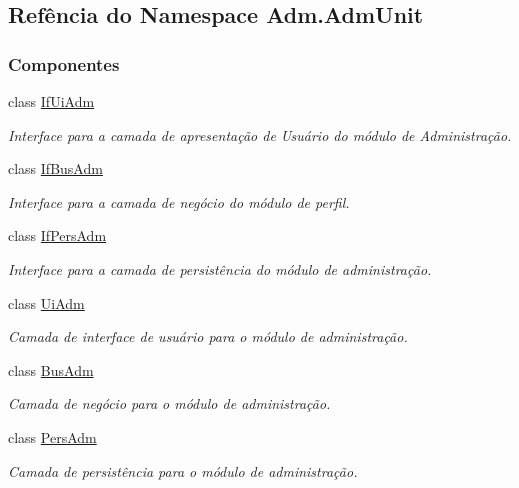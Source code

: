 \hypertarget{namespaceAdm_1_1AdmUnit}{\subsection{Refência do Namespace Adm.\-Adm\-Unit}
\label{namespaceAdm_1_1AdmUnit}
}
\subsubsection*{Componentes}
\begin{DoxyCompactItemize}
\item 
class \hyperlink{classAdm_1_1AdmUnit_1_1IfUiAdm}{If\-Ui\-Adm}
\begin{DoxyCompactList}\small\item\em Interface para a camada de apresentação de Usuário do módulo de Administração. \end{DoxyCompactList}\item 
class \hyperlink{classAdm_1_1AdmUnit_1_1IfBusAdm}{If\-Bus\-Adm}
\begin{DoxyCompactList}\small\item\em Interface para a camada de negócio do módulo de perfil. \end{DoxyCompactList}\item 
class \hyperlink{classAdm_1_1AdmUnit_1_1IfPersAdm}{If\-Pers\-Adm}
\begin{DoxyCompactList}\small\item\em Interface para a camada de persistência do módulo de administração. \end{DoxyCompactList}\item 
class \hyperlink{classAdm_1_1AdmUnit_1_1UiAdm}{Ui\-Adm}
\begin{DoxyCompactList}\small\item\em Camada de interface de usuário para o módulo de administração. \end{DoxyCompactList}\item 
class \hyperlink{classAdm_1_1AdmUnit_1_1BusAdm}{Bus\-Adm}
\begin{DoxyCompactList}\small\item\em Camada de negócio para o módulo de administração. \end{DoxyCompactList}\item 
class \hyperlink{classAdm_1_1AdmUnit_1_1PersAdm}{Pers\-Adm}
\begin{DoxyCompactList}\small\item\em Camada de persistência para o módulo de administração. \end{DoxyCompactList}\end{DoxyCompactItemize}
